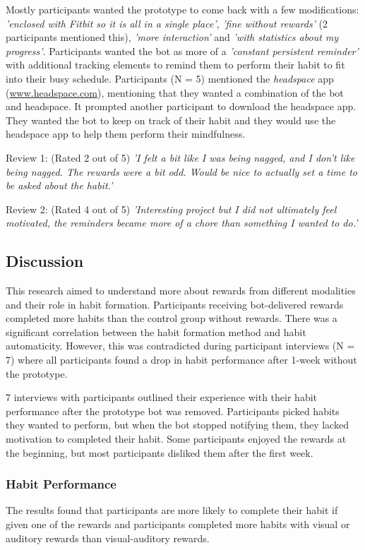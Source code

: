 Mostly participants wanted the prototype to come back with a few modifications: \textit{'enclosed with Fitbit so it is all in a single place'}, \textit{'fine without rewards'} (2 participants mentioned this), \textit{'more interaction'} and \textit{'with statistics about my progress'}. Participants wanted the bot as more of a \textit{'constant persistent reminder'} with additional tracking elements to remind them to perform their habit to fit into their busy schedule. Participants (N = 5) mentioned the \textit{headspace} app (\url{www.headspace.com}), mentioning that they wanted a combination of the bot and headspace. It prompted another participant to download the headspace app. They wanted the bot to keep on track of their habit and they would use the headspace app to help them perform their mindfulness.

Review 1: (Rated 2 out of 5) \textit{'I felt a bit like I was being nagged, and I don't like being nagged. The rewards were a bit odd. Would be nice to actually set a time to be asked about the habit.'}


Review 2: (Rated 4 out of 5) \textit{'Interesting project but I did not ultimately feel motivated, the reminders became more of a chore than something I wanted to do.'}


\subsection{Discussion}
This research aimed to understand more about rewards from different modalities and their role in habit formation. Participants receiving bot-delivered rewards completed more habits than the control group without rewards. There was a significant correlation between the habit formation method and habit automaticity. However, this was contradicted during participant interviews (N = 7) where all participants found a drop in habit performance after 1-week without the prototype.

7 interviews with participants outlined their experience with their habit performance after the prototype bot was removed. Participants picked habits they wanted to perform, but when the bot stopped notifying them, they lacked motivation to completed their habit. Some participants enjoyed the rewards at the beginning, but most participants disliked them after the first week.

\subsubsection{Habit Performance}
The results found that participants are more likely to complete their habit if given one of the rewards and participants completed more habits with visual or auditory rewards than visual-auditory rewards.

